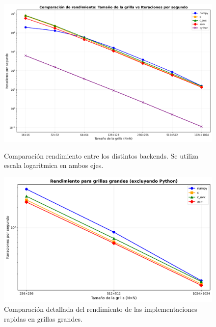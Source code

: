 \documentclass[a4paper]{article}
\begin{document}
\begin{figure}[h]
    \centering
    \begin{minipage}[t]{0.48\textwidth}
        \centering
        \includegraphics[width=\textwidth]{extra/steps_per_second.png}
        \caption{Comparación rendimiento entre los distintos backends. Se utiliza escala logaritmica en ambos ejes.}
        \label{fig:performance}
    \end{minipage}
    \hfill
    \begin{minipage}[t]{0.48\textwidth}
        \centering
        \includegraphics[width=\textwidth]{extra/steps_per_second_top3.png}
        \caption{Comparación detallada del rendimiento de las implementaciones rapidas en grillas grandes.}
        \label{fig:performance_top3}
    \end{minipage}
\end{figure}
\end{document}
